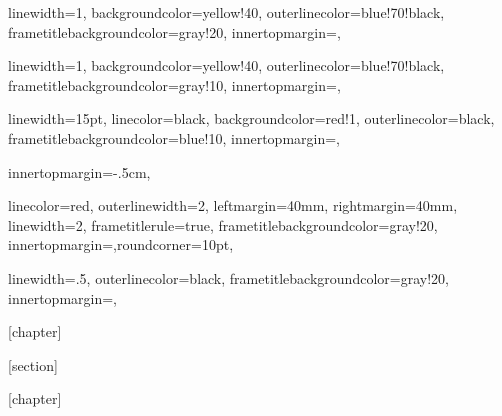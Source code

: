\newenvironment{acknol}{   
  \chapter*{Acknoledgements}
  \setstretch{1.3}
}
{
\clearpage
}


{linewidth=1,
backgroundcolor=yellow!40,
outerlinecolor=blue!70!black,
frametitlebackgroundcolor=gray!20,
innertopmargin=\topskip,}


{linewidth=1,
backgroundcolor=yellow!40,
outerlinecolor=blue!70!black,
frametitlebackgroundcolor=gray!10,
innertopmargin=\topskip,}

{linewidth=15pt,
linecolor=black,
backgroundcolor=red!1,
outerlinecolor=black,
frametitlebackgroundcolor=blue!10,
innertopmargin=\topskip,}

{%
innertopmargin=-.5cm,}

{linecolor=red,
outerlinewidth=2,
leftmargin=40mm,
rightmargin=40mm,
linewidth=2,
frametitlerule=true,
frametitlebackgroundcolor=gray!20,
innertopmargin=\topskip,roundcorner=10pt,}

{linewidth=.5,
outerlinecolor=black,
frametitlebackgroundcolor=gray!20,
innertopmargin=\topskip,}



[chapter]

[section]


[chapter]

